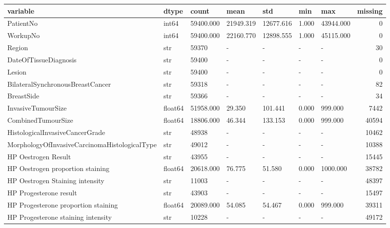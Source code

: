 \begin{tabular}{lllllllr}
\toprule
variable & dtype & count & mean & std & min & max & missing \\
\midrule
PatientNo & int64 & 59400.000 & 21949.319 & 12677.616 & 1.000 & 43944.000 & 0 \\
WorkupNo & int64 & 59400.000 & 22160.770 & 12898.555 & 1.000 & 45115.000 & 0 \\
Region & str & 59370 & - & - & - & - & 30 \\
DateOfTissueDiagnosis & str & 59400 & - & - & - & - & 0 \\
Lesion & str & 59400 & - & - & - & - & 0 \\
BilateralSynchronousBreastCancer & str & 59318 & - & - & - & - & 82 \\
BreastSide & str & 59366 & - & - & - & - & 34 \\
InvasiveTumourSize & float64 & 51958.000 & 29.350 & 101.441 & 0.000 & 999.000 & 7442 \\
CombinedTumourSize & float64 & 18806.000 & 46.344 & 133.153 & 0.000 & 999.000 & 40594 \\
HistologicalInvasiveCancerGrade & str & 48938 & - & - & - & - & 10462 \\
MorphologyOfInvasiveCarcinomaHistologicalType & str & 49012 & - & - & - & - & 10388 \\
HP Oestrogen Result & str & 43955 & - & - & - & - & 15445 \\
HP Oestrogen proportion staining & float64 & 20618.000 & 76.775 & 51.580 & 0.000 & 1000.000 & 38782 \\
HP Oestrogen Staining intensity & str & 11003 & - & - & - & - & 48397 \\
HP Progesterone result & str & 43903 & - & - & - & - & 15497 \\
HP Progesterone proportion staining & float64 & 20089.000 & 54.085 & 54.467 & 0.000 & 999.000 & 39311 \\
HP Progesterone staining intensity & str & 10228 & - & - & - & - & 49172 \\
\bottomrule
\end{tabular}
